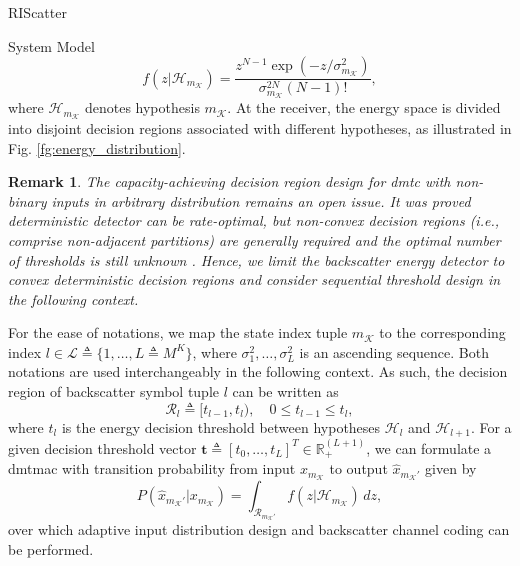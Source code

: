 \documentclass[journal]{IEEEtran}
\newtheorem{remark}{Remark}
\begin{document}
\begin{section}{RIScatter}
\begin{subsection}{System Model}
		\begin{equation}
			f(z|\mathcal{H}_{m_{\mathcal{K}}}) = \frac{z^{N-1} \exp(-z/\sigma_{m_{\mathcal{K}}}^2)}{\sigma_{m_{\mathcal{K}}}^{2N} (N-1)!},
			\label{eq:energy_distribution}
		\end{equation}
		where $\mathcal{H}_{m_{\mathcal{K}}}$ denotes hypothesis $m_{\mathcal{K}}$.
		At the receiver, the energy space is divided into disjoint decision regions associated with different hypotheses, as illustrated in Fig. \ref{fg:energy_distribution}.
		\begin{remark}
			The capacity-achieving decision region design for \gls{dmtc} with non-binary inputs in arbitrary distribution remains an open issue.
			It was proved deterministic detector can be rate-optimal, but non-convex decision regions (i.e., comprise non-adjacent partitions) are generally required and the optimal number of thresholds is still unknown \cite{Nguyen2018,Nguyen2021}.
			Hence, we limit the backscatter energy detector to convex deterministic decision regions and consider sequential threshold design in the following context.
		\end{remark}

		For the ease of notations, we map the state index tuple $m_{\mathcal{K}}$ to the corresponding index $l \in \mathcal{L} \triangleq \{1,\ldots,L \triangleq M^K\}$, where $\sigma_1^2,\ldots,\sigma_L^2$ is an ascending sequence.
		Both notations are used interchangeably in the following context.
		As such, the decision region of backscatter symbol tuple $l$ can be written as
		\begin{equation}
			\mathcal{R}_{l} \triangleq [t_{l-1},t_l), \quad 0 \le t_{l-1} \le t_l,
		\end{equation}
		where $t_l$ is the energy decision threshold between hypotheses $\mathcal{H}_{l}$ and $\mathcal{H}_{l+1}$.
		For a given decision threshold vector $\boldsymbol{t} \triangleq [t_0,\ldots,t_L]^T \in \mathbb{R}_+^{(L+1)}$, we can formulate a \gls{dmtmac} with transition probability from input $x_{m_{\mathcal{K}}}$ to output $\hat{x}_{m_{\mathcal{K}}'}$ given by
		\begin{equation}
			P(\hat{x}_{m_{\mathcal{K}}'}|x_{m_{\mathcal{K}}}) = \int_{\mathcal{R}_{m_{\mathcal{K}}'}} f(z|\mathcal{H}_{m_{\mathcal{K}}}) \, d z,
			\label{eq:dmtmac}
		\end{equation}
		over which adaptive input distribution design and backscatter channel coding can be performed.
		\label{st:system_model}
	\end{subsection}


\end{section}
\end{document}
